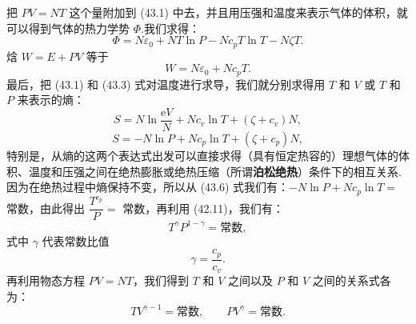 把 $PV=NT$ 这个量附加到 (43.1) 中去，并且用压强和温度来表示气体的体积，就可以得到气体的热力学势 $\Phi$.我们求得：
\begin{equation}
  \Phi=N\varepsilon_0+NT\ln P-Nc_pT\ln T-N\zeta T.
\end{equation}
焓 $W=E+PV$ 等于
\begin{equation}
  W=N\varepsilon_0+Nc_pT.
\end{equation}
最后，把 (43.1) 和 (43.3) 式对温度进行求导，我们就分别求得用 $T$ 和 $V$ 或 $T$ 和 $P$ 来表示的熵：
\begin{equation}
  S=N\ln\frac{\mathrm{e}V}{N}+Nc_v\ln T+\left(\zeta+c_v\right)N,
\end{equation}
\begin{equation}
  S=-N\ln P+Nc_p\ln T+\left(\zeta+c_p\right)N,
\end{equation}
特别是，从熵的这两个表达式出发可以直接求得（具有恒定热容的）理想气体的体积、温度和压强之间在绝热膨胀或绝热压缩（所谓\textbf{泊松绝热}）条件下的相互关系.因为在绝热过程中熵保持不变，所以从 (43.6) 式我们有：$-N\ln P+Nc_p\ln T=$ 常数，由此得出 $\dfrac{T^{c_p}}{P}=$ 常数，再利用 (42.11)，我们有：
\begin{equation}
  T^{\gamma}P^{1-\gamma}=\text{常数},
\end{equation}
式中 $\gamma$ 代表常数比值
\begin{equation}
  \gamma=\frac{c_p}{c_v}.
\end{equation}
再利用物态方程 $PV=NT$，我们得到 $T$ 和 $V$ 之间以及 $P$ 和 $V$ 之间的关系式各为：
\begin{equation}
  TV^{\gamma-1}=\text{常数},\qquad PV^{\gamma}=\text{常数}.
\end{equation}


